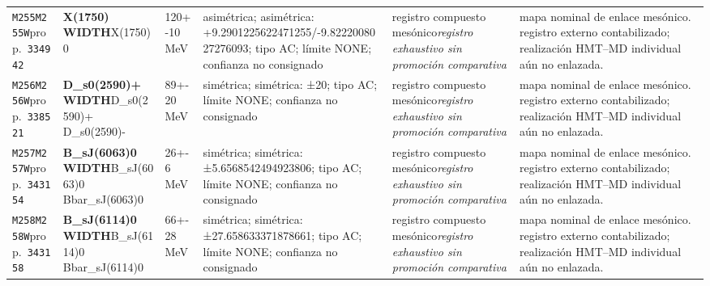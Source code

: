 \begin{landscape}
\begin{longtable}{L{1.85cm}L{4.45cm}L{2.35cm}L{4.05cm}L{3.35cm}L{7.15cm}}
\texttt{M255}\newline \texttt{M255W}\newline prop.\ \texttt{334942} & \textbf{X(1750) WIDTH}\newline X(1750)0 & 120+-10\,MeV & asimétrica; asimétrica: +9.2901225622471255/-9.8222008027276093; tipo AC; límite NONE; confianza no consignado & registro compuesto mesónico\newline \emph{registro exhaustivo sin promoción comparativa} & mapa nominal de enlace mesónico. registro externo contabilizado; realización HMT--MD individual aún no enlazada. \\
\texttt{M256}\newline \texttt{M256W}\newline prop.\ \texttt{338521} & \textbf{D\_\allowbreak{}s0(2590)+ WIDTH}\newline D\_\allowbreak{}s0(2590)+ \textbar{}\allowbreak{} D\_\allowbreak{}s0(2590)- & 89+-20\,MeV & simétrica; simétrica: ±20; tipo AC; límite NONE; confianza no consignado & registro compuesto mesónico\newline \emph{registro exhaustivo sin promoción comparativa} & mapa nominal de enlace mesónico. registro externo contabilizado; realización HMT--MD individual aún no enlazada. \\
\texttt{M257}\newline \texttt{M257W}\newline prop.\ \texttt{343154} & \textbf{B\_\allowbreak{}sJ(6063)0 WIDTH}\newline B\_\allowbreak{}sJ(6063)0 \textbar{}\allowbreak{} Bbar\_\allowbreak{}sJ(6063)0 & 26+-6\,MeV & simétrica; simétrica: ±5.6568542494923806; tipo AC; límite NONE; confianza no consignado & registro compuesto mesónico\newline \emph{registro exhaustivo sin promoción comparativa} & mapa nominal de enlace mesónico. registro externo contabilizado; realización HMT--MD individual aún no enlazada. \\
\texttt{M258}\newline \texttt{M258W}\newline prop.\ \texttt{343158} & \textbf{B\_\allowbreak{}sJ(6114)0 WIDTH}\newline B\_\allowbreak{}sJ(6114)0 \textbar{}\allowbreak{} Bbar\_\allowbreak{}sJ(6114)0 & 66+-28\,MeV & simétrica; simétrica: ±27.658633371878661; tipo AC; límite NONE; confianza no consignado & registro compuesto mesónico\newline \emph{registro exhaustivo sin promoción comparativa} & mapa nominal de enlace mesónico. registro externo contabilizado; realización HMT--MD individual aún no enlazada. \\

\end{longtable}
\end{landscape}
